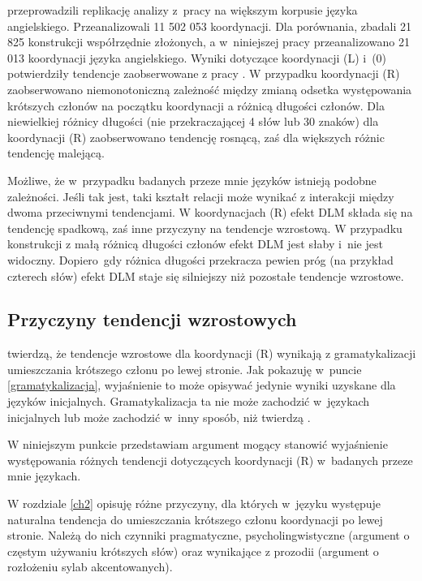 \cite{przepiorkowski2024argument} przeprowadzili replikację analizy z~pracy \cite{przepiorkowski2023conjunct} na większym korpusie języka angielskiego. Przeanalizowali 11 502 053 koordynacji. Dla porównania, \cite{przepiorkowski2023conjunct} zbadali 21 825 konstrukcji współrzędnie złożonych, a w~niniejszej pracy przeanalizowano 21 013 koordynacji języka angielskiego. Wyniki dotyczące koordynacji (L) i~(0) potwierdziły tendencje zaobserwowane z pracy \cite{przepiorkowski2023conjunct}. W przypadku koordynacji (R) zaobserwowano niemonotoniczną zależność między zmianą odsetka występowania krótszych członów na początku koordynacji a różnicą długości członów. Dla niewielkiej różnicy długości (nie przekraczającej 4 słów lub 30 znaków) dla koordynacji (R) zaobserwowano tendencję rosnącą, zaś dla większych różnic tendencję malejącą. 

Możliwe, że w~przypadku badanych przeze mnie języków istnieją podobne zależności. Jeśli tak jest, taki kształt relacji  może wynikać z interakcji między dwoma przeciwnymi tendencjami. W koordynacjach (R) efekt DLM składa się na tendencję spadkową, zaś inne przyczyny na tendencje wzrostową. W przypadku konstrukcji z małą różnicą długości członów efekt DLM jest słaby i~nie jest widoczny. Dopiero~gdy różnica długości przekracza pewien próg (na przykład czterech słów) efekt DLM staje się silniejszy niż pozostałe tendencje wzrostowe.

\subsection{Przyczyny tendencji wzrostowych}

\cite{przepiorkowski2023conjunct} twierdzą, że tendencje wzrostowe dla koordynacji (R) wynikają z gramatykalizacji umieszczania krótszego członu po lewej stronie. Jak pokazuję w~puncie \ref{gramatykalizacja}, wyjaśnienie to może opisywać jedynie wyniki uzyskane dla języków inicjalnych. Gramatykalizacja ta nie może zachodzić w~językach inicjalnych lub może zachodzić w~inny sposób, niż twierdzą \cite{przepiorkowski2023conjunct}.

W niniejszym punkcie przedstawiam argument mogący stanowić wyjaśnienie występowania różnych tendencji dotyczących koordynacji (R) w~badanych przeze mnie językach.

W rozdziale \ref{ch2} opisuję różne przyczyny, dla których w~języku występuje naturalna tendencja do umieszczania krótszego członu koordynacji po lewej stronie. Należą do nich czynniki pragmatyczne, psycholingwistyczne (argument o częstym używaniu krótszych słów) oraz  wynikające z prozodii (argument o rozłożeniu sylab akcentowanych). 

